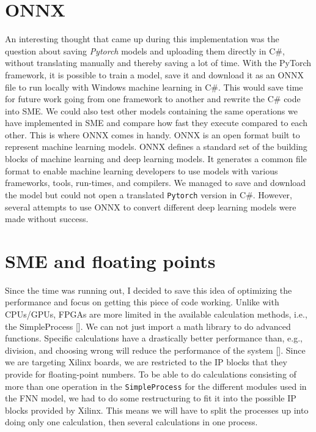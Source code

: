 \section{ONNX}

An interesting thought that came up during this implementation was the question about saving \emph{Pytorch} models and uploading them directly in C\#, without translating manually and thereby saving a lot of time. 
With the PyTorch framework, it is possible to train a model, save it and download it as an ONNX file to run locally with Windows machine learning in C\#. This would save time for future work going from one framework to another and rewrite the C\# code into SME. 
We could also test other models containing the same operations we have implemented in SME and compare how fast they execute compared to each other.
This is where ONNX comes in handy. ONNX is an open format built to represent machine learning models. ONNX defines a standard set of the building blocks of machine learning and deep learning models. It generates a common file format to enable machine learning developers to use models with various frameworks, tools, run-times, and compilers.
We managed to save and download the model but could not open a translated \texttt{Pytorch} version in C\#. However, several attempts to use ONNX to convert different deep learning models were made without success. 

\newpage


\section{SME and floating points}
Since the time was running out, I decided to save this idea of optimizing the performance and focus on getting this piece of code working. 
Unlike with CPUs/GPUs, FPGAs are more limited in the available calculation methods, i.e., the SimpleProcess [\cite{LennartJones}]. We can not just import a math library to do advanced functions. Specific calculations have a drastically better performance than, e.g., division, and choosing wrong will reduce the performance of the system [\cite{LennartJones}]. Since we are targeting Xilinx boards, we are restricted to the \ac{IP} blocks that they provide for floating-point numbers. To be able to do calculations consisting of more than one operation in the \texttt{SimpleProcess} for the different modules used in the FNN model, we had to do some restructuring to fit it into the possible IP blocks provided by Xilinx. This means we will have to split the processes up into doing only one calculation, then several calculations in one process.\\

